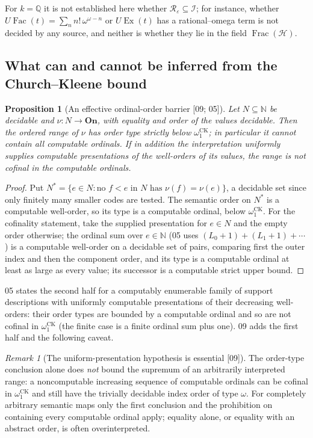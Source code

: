 \documentclass[11pt,oneside]{article}
\numberwithin{equation}{section}
\newtheorem{proposition}[proposition]{Proposition}
\theoremstyle{definition}
\theoremstyle{remark}
\newtheorem{remark}[remark]{Remark}
\newcommand{\On}{\mathbf{On}}
\newcommand{\N}{\mathbb N}
\newcommand{\Q}{\mathbb Q}
\newcommand{\FH}{\operatorname{Frac}(\mathcal H)}
\newcommand{\IO}{\mathcal I}
\newcommand{\Ex}{\operatorname{Ex}}
\newcommand{\Fac}{\operatorname{Fac}}
\newcommand{\CK}{\omega_1^{\mathrm{CK}}}
\newcommand{\src}[1]{\textup{\textsf{\small[#1]}}}
\begin{document}
For $k=\Q$ it is not established here whether $\mathcal R_\varepsilon\subseteq\IO$;
for instance, whether $U\Fac(t)=\sum_nn!\,\omega^{\omega-n}$ or $U\Ex(t)$ has a
rational--omega term is not decided by any source, and neither is whether they
lie in the field $\FH$.

\subsection{What can and cannot be inferred from the Church--Kleene bound}

\begin{proposition}[An effective ordinal-order barrier \src{09; 05}]\label{onot:grid:prop:CK}
Let $N\subseteq\N$ be decidable and $\nu:N\to\On$, with equality and order of
the values decidable. Then the ordered range of $\nu$ has order type strictly
below $\CK$; in particular it cannot contain all computable ordinals. If in
addition the interpretation uniformly supplies computable presentations of the
well-orders of its values, the range is not cofinal in the computable ordinals.
\end{proposition}
\begin{proof}
Put $N^*=\{e\in N:\text{no }f<e\text{ in }N\text{ has }\nu(f)=\nu(e)\}$, a
decidable set since only finitely many smaller codes are tested. The semantic
order on $N^*$ is a computable well-order, so its type is a computable ordinal,
below $\CK$. For the cofinality statement, take the supplied presentation for
$e\in N$ and the empty order otherwise; the ordinal sum over $e\in\N$ (05 uses
$(L_0+1)+(L_1+1)+\cdots$) is a computable well-order on a decidable set of pairs,
comparing first the outer index and then the component order, and its type is a
computable ordinal at least as large as every value; its successor is a computable
strict upper bound.
\end{proof}

05 states the second half for a computably enumerable family of support
descriptions with uniformly computable presentations of their decreasing
well-orders: their order types are bounded by a computable ordinal and so are not
cofinal in $\CK$ (the finite case is a finite ordinal sum plus one). 09 adds the
first half and the following caveat.

\begin{remark}[The uniform-presentation hypothesis is essential \src{09}]\label{onot:grid:rem:CK}
The order-type conclusion alone does \emph{not} bound the supremum of an
arbitrarily interpreted range: a noncomputable increasing sequence of computable
ordinals can be cofinal in $\CK$ and still have the trivially decidable index
order of type $\omega$. For completely arbitrary semantic maps only the first
conclusion and the prohibition on containing every computable ordinal apply;
equality alone, or equality with an abstract order, is often overinterpreted.
\end{remark}
\end{document}
